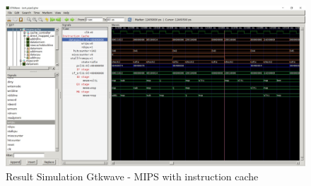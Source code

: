 \begin{figure}
	\centering
	\includegraphics[scale=.4]{pictures/gtkwave_result_mipsWithInstructionCache}
	\caption{Result Simulation Gtkwave - MIPS with instruction cache}
	\label{fig:mipsWithInstrCache}
\end{figure}




